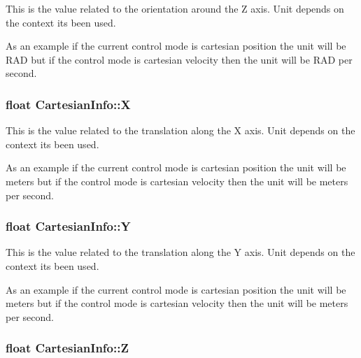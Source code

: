 This is the value related to the orientation around the Z axis. Unit depends on the context it\textquotesingle{}s been used. 

As an example if the current control mode is cartesian position the unit will be R\+AD but if the control mode is cartesian velocity then the unit will be R\+AD per second. 
\subsubsection[{\texorpdfstring{X}{X}}]{\setlength{\rightskip}{0pt plus 5cm}float Cartesian\+Info\+::X\hspace{0.3cm}{\ttfamily [inherited]}}\hypertarget{structCartesianInfo_a212cc2dcae1697132fc31fa2f5d17269}{}\label{structCartesianInfo_a212cc2dcae1697132fc31fa2f5d17269}


This is the value related to the translation along the X axis. Unit depends on the context it\textquotesingle{}s been used. 

As an example if the current control mode is cartesian position the unit will be meters but if the control mode is cartesian velocity then the unit will be meters per second. 
\subsubsection[{\texorpdfstring{Y}{Y}}]{\setlength{\rightskip}{0pt plus 5cm}float Cartesian\+Info\+::Y\hspace{0.3cm}{\ttfamily [inherited]}}\hypertarget{structCartesianInfo_a12c2611c89445419b336e58815d87c7c}{}\label{structCartesianInfo_a12c2611c89445419b336e58815d87c7c}


This is the value related to the translation along the Y axis. Unit depends on the context it\textquotesingle{}s been used. 

As an example if the current control mode is cartesian position the unit will be meters but if the control mode is cartesian velocity then the unit will be meters per second. 
\subsubsection[{\texorpdfstring{Z}{Z}}]{\setlength{\rightskip}{0pt plus 5cm}float Cartesian\+Info\+::Z\hspace{0.3cm}{\ttfamily [inherited]}}\hypertarget{structCartesianInfo_a14e196e4cb38c0ae7f4658b9b070b7fe}{}\label{structCartesianInfo_a14e196e4cb38c0ae7f4658b9b070b7fe}


